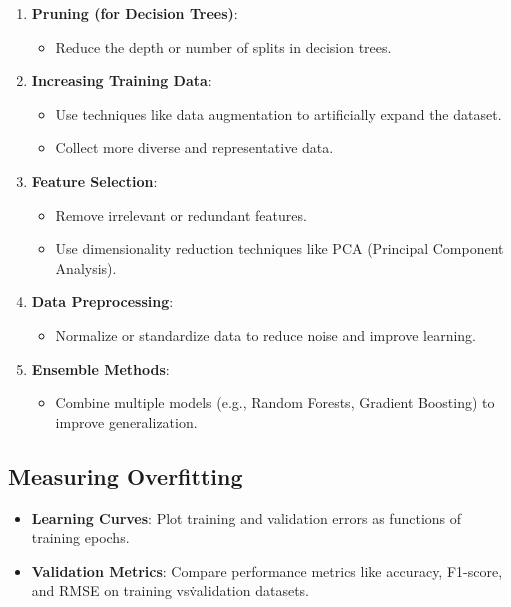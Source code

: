 \begin{enumerate}
    \item \textbf{Pruning (for Decision Trees)}:
    \begin{itemize}
        \item Reduce the depth or number of splits in decision trees.
    \end{itemize}
    \item \textbf{Increasing Training Data}:
    \begin{itemize}
        \item Use techniques like data augmentation to artificially expand the dataset.
        \item Collect more diverse and representative data.
    \end{itemize}
    \item \textbf{Feature Selection}:
    \begin{itemize}
        \item Remove irrelevant or redundant features.
        \item Use dimensionality reduction techniques like PCA (Principal Component Analysis).
    \end{itemize}
    \item \textbf{Data Preprocessing}:
    \begin{itemize}
        \item Normalize or standardize data to reduce noise and improve learning.
    \end{itemize}
    \item \textbf{Ensemble Methods}:
    \begin{itemize}
        \item Combine multiple models (e.g., Random Forests, Gradient Boosting) to improve generalization.
    \end{itemize}
\end{enumerate}

\subsection*{Measuring Overfitting}
\begin{itemize}
    \item \textbf{Learning Curves}: Plot training and validation errors as functions of training epochs.
    \item \textbf{Validation Metrics}: Compare performance metrics like accuracy, F1-score, and RMSE on training vs\. validation datasets.
\end{itemize}

